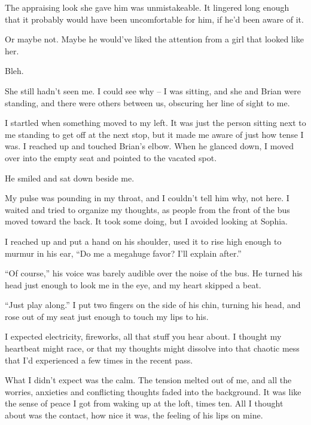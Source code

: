 The appraising look she gave him was unmistakeable.  It lingered long enough that it probably would have been uncomfortable for him, if he'd been aware of it.



Or maybe not.  Maybe he would've liked the attention from a girl that looked like her.



Bleh.



She still hadn't seen me.  I could see why – I was sitting, and she and Brian were standing, and there were others between us, obscuring her line of sight to me.



I startled when something moved to my left.  It was just the person sitting next to me standing to get off at the next stop, but it made me aware of just how tense I was.  I reached up and touched Brian's elbow.  When he glanced down, I moved over into the empty seat and pointed to the vacated spot.



He smiled and sat down beside me.



My pulse was pounding in my throat, and I couldn't tell him why, not here.  I waited and tried to organize my thoughts, as people from the front of the bus moved toward the back.  It took some doing, but I avoided looking at Sophia.



I reached up and put a hand on his shoulder, used it to rise high enough to murmur in his ear, ``Do me a megahuge favor?  I'll explain after.''



``Of course,'' his voice was barely audible over the noise of the bus.  He turned his head just enough to look me in the eye, and my heart skipped a beat.



``Just play along.''  I put two fingers on the side of his chin, turning his head, and rose out of my seat just enough to touch my lips to his.



I expected electricity, fireworks, all that stuff you hear about.  I thought my heartbeat might race, or that my thoughts might dissolve into that chaotic mess that I'd experienced a few times in the recent pass.



What I didn't expect was the calm.  The tension melted out of me, and all the worries, anxieties and conflicting thoughts faded into the background.  It was like the sense of peace I got from waking up at the loft, times ten.  All I thought about was the contact, how nice it was, the feeling of his lips on mine.



